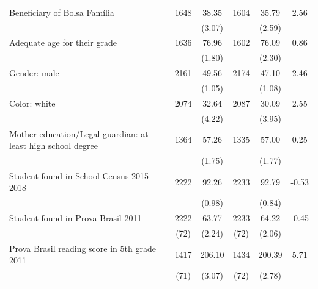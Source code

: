 \documentclass[
	article,			%
	12pt,				%
	oneside,			%
	a4paper,			%
	]{article}
\begin{document}
\begin{table}[h!]
\begin{tabular}{lccccc}
Beneficiary of Bolsa Família &       1648 &      38.35 &       1604 &      35.79 &      2.56 \\

           &            &     (3.07) &            &     (2.59) &            \\

Adequate age for their grade &       1636 &      76.96 &       1602 &      76.09 &       0.86 \\

           &            &     (1.80) &            &     (2.30) &            \\

Gender: male &       2161 &      49.56 &       2174 &      47.10 &      2.46 \\

           &            &     (1.05) &            &     (1.08) &            \\

Color: white &       2074 &      32.64 &       2087 &      30.09 &       2.55 \\

           &            &     (4.22) &            &     (3.95) &            \\

Mother education/Legal guardian: at least high school degree &       1364 &      57.26 &       1335 &      57.00 &       0.25 \\

           &            &     (1.75) &            &     (1.77) &            \\

Student found in School Census 2015-2018 &       2222 &      92.26 &       2233 &      92.79 &      -0.53 \\

           &            &     (0.98) &            &     (0.84) &            \\

Student found in Prova Brasil 2011 &       2222 &      63.77 &       2233 &      64.22 &      -0.45 \\

           &       (72) &     (2.24) &       (72) &     (2.06) &            \\

Prova Brasil reading score in 5th grade 2011 &       1417 &     206.10 &       1434 &     200.39 &     5.71 \\

           &       (71) &     (3.07) &       (72) &     (2.78) &            \\


\end{tabular}
\end{table}
\end{document}
